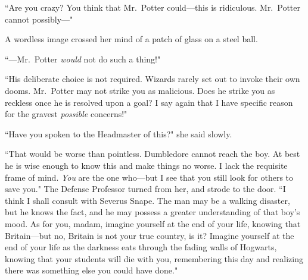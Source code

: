 ``Are you crazy? You think that Mr.~Potter could---this is ridiculous. Mr.~Potter cannot possibly---"

A wordless image crossed her mind of a patch of glass on a steel ball.

``---Mr.~Potter \emph{would} not do such a thing!"

``His deliberate choice is not required. Wizards rarely set out to invoke their own dooms. Mr.~Potter may not strike you as malicious. Does he strike you as reckless once he is resolved upon a goal? I say again that I have specific reason for the gravest \emph{possible} concerns!"

``Have you spoken to the Headmaster of this?" she said slowly.

``That would be worse than pointless. Dumbledore cannot reach the boy. At best he is wise enough to know this and make things no worse. I lack the requisite frame of mind. \emph{You} are the one who---but I see that you still look for others to save you." The Defense Professor turned from her, and strode to the door. ``I think I shall consult with Severus Snape. The man may be a walking disaster, but he knows the fact, and he may possess a greater understanding of that boy's mood. As for you, madam, imagine yourself at the end of your life, knowing that Britain---but no, Britain is not your true country, is it? Imagine yourself at the end of your life as the darkness eats through the fading walls of Hogwarts, knowing that your students will die with you, remembering this day and realizing there was something else you could have done."

